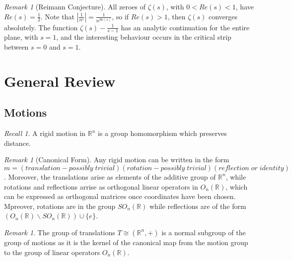 \documentclass[12pt]{article}
\theoremstyle{definition}
\theoremstyle{remark}
\newtheorem{rmk}[thm]{Remark}
\newtheorem*{rec}{Recall}
\numberwithin{equation}{section}
\newcommand\R{\mathbb R}    %
\begin{document}
\begin{rmk}[Reimann Conjecture]
        All zeroes of $\zeta(s)$, with $0 < Re(s) < 1$, have $Re(s) = \frac{1}{2}$. Note that $\left|\frac{1}{n^s}\right| = \frac{1}{n^{Re(s)}}$, so if $Re(s) > 1$, then $\zeta(s)$ converges absolutely. The function $\zeta(s) - \frac{1}{s-1}$ has an analytic continuation for the entire plane, with $s = 1$, and the interesting behaviour occurs in the critical strip between $s= 0$ and $s= 1$.
\end{rmk}



\clearpage


\section{General Review}


\subsection{Motions}

\begin{rec}
        A rigid motion in $\R^n$ is a group homomorphism which preserves distance.
\end{rec}

\vspace{15pt}

\begin{rmk}[Canonical Form]
        Any rigid motion can be written in the form $m = (translation-possibly\;trivial)(rotation-possibly\;trivial)(reflection\;or\;identity)$. Moreover, the translations arise as elements of the additive group of $\R^n$, while rotations and reflections arrise as orthogonal linear operators in $O_n(\R)$, which can be expressed as orthogonal matrices once coordinates have been chosen. Mpreover, rotations are in the group $SO_n(\R)$ while reflections are of the form $(O_n(\R)\backslash SO_n(\R))\cup \{e\}$. 
\end{rmk}


\vspace{15pt}

\begin{rmk}
        The group of translations $T \cong (\R^n,+)$ is a normal subgroup of the group of motions as it is the kernel of the canonical map from the motion group to the group of linear operators $O_n(\R)$.
\end{rmk}

\vspace{15pt}
\end{document}

